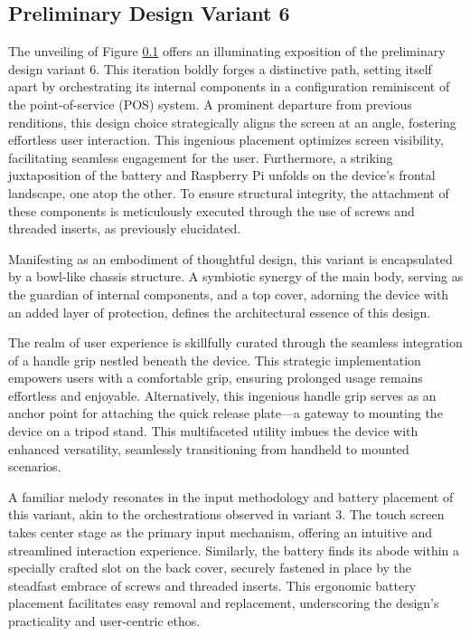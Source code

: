 \subsection{Preliminary Design Variant 6}

The unveiling of Figure \ref{} offers an illuminating exposition of the preliminary design variant 6. This iteration boldly forges a distinctive path, setting itself apart by orchestrating its internal components in a configuration reminiscent of the point-of-service (POS) system. A prominent departure from previous renditions, this design choice strategically aligns the screen at an angle, fostering effortless user interaction. This ingenious placement optimizes screen visibility, facilitating seamless engagement for the user. Furthermore, a striking juxtaposition of the battery and Raspberry Pi unfolds on the device's frontal landscape, one atop the other. To ensure structural integrity, the attachment of these components is meticulously executed through the use of screws and threaded inserts, as previously elucidated.

Manifesting as an embodiment of thoughtful design, this variant is encapsulated by a bowl-like chassis structure. A symbiotic synergy of the main body, serving as the guardian of internal components, and a top cover, adorning the device with an added layer of protection, defines the architectural essence of this design.

The realm of user experience is skillfully curated through the seamless integration of a handle grip nestled beneath the device. This strategic implementation empowers users with a comfortable grip, ensuring prolonged usage remains effortless and enjoyable. Alternatively, this ingenious handle grip serves as an anchor point for attaching the quick release plate—a gateway to mounting the device on a tripod stand. This multifaceted utility imbues the device with enhanced versatility, seamlessly transitioning from handheld to mounted scenarios.

A familiar melody resonates in the input methodology and battery placement of this variant, akin to the orchestrations observed in variant 3. The touch screen takes center stage as the primary input mechanism, offering an intuitive and streamlined interaction experience. Similarly, the battery finds its abode within a specially crafted slot on the back cover, securely fastened in place by the steadfast embrace of screws and threaded inserts. This ergonomic battery placement facilitates easy removal and replacement, underscoring the design's practicality and user-centric ethos.

